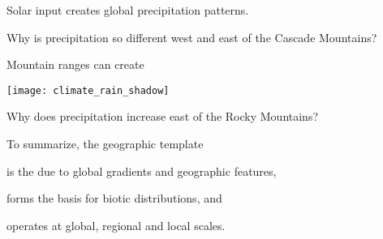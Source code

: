 \documentclass[t]{beamer}
\begin{document}
{
\begin{frame}[t,plain]{Solar input creates global precipitation patterns.}
\end{frame}
}

{
\begin{frame}[t,plain]
\end{frame}
}

{
\begin{frame}[t,plain]
\end{frame}
}

{
\begin{frame}[t,plain]{Why is precipitation so different west and east of the Cascade Mountains?}
\end{frame}
}


\begin{frame}[t,plain]{Mountain ranges can create }
	\begin{center}
		\texttt{[image: climate\_rain\_shadow]}
	\end{center}
\end{frame}

{
\begin{frame}[t,plain]{Why does precipitation increase east of the Rocky Mountains?}
\end{frame}
}

\begin{frame}[t,plain]{To summarize, the geographic template}

	\hangpara is the  due to global gradients and geographic features,
	
	\hangpara forms the basis for biotic distributions, and
	
	\hangpara operates at global, regional and local scales.
\end{frame}
\end{document}
